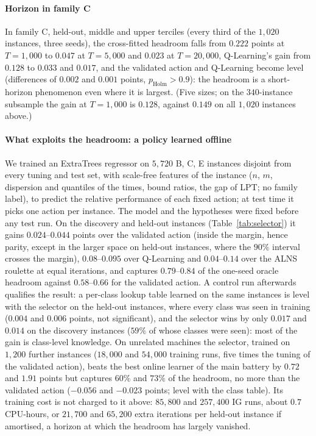 \paragraph{Horizon in family C} In family C, held-out, middle and upper terciles (every third of the $1{,}020$ instances, three seeds), the cross-fitted headroom falls from $0.222$ points at $T=1{,}000$ to $0.047$ at $T=5{,}000$ and $0.023$ at $T=20{,}000$, Q-Learning's gain from $0.128$ to $0.033$ and $0.017$, and the validated action and Q-Learning become level (differences of $0.002$ and $0.001$ points, $p_{\mathrm{Holm}}>0.9$): the headroom is a short-horizon phenomenon even where it is largest. (Five sizes; on the $340$-instance subsample the gain at $T=1{,}000$ is $0.128$, against $0.149$ on all $1{,}020$ instances above.)

\paragraph{What exploits the headroom: a policy learned offline} We trained an ExtraTrees regressor on $5{,}720$ B, C, E instances disjoint from every tuning and test set, with scale-free features of the instance ($n$, $m$, dispersion and quantiles of the times, bound ratios, the gap of LPT; no family label), to predict the relative performance of each fixed action; at test time it picks one action per instance. The model and the hypotheses were fixed before any test run. On the discovery and held-out instances (Table~\ref{tab:selector}) it gains $0.024$--$0.044$ points over the validated action (inside the margin, hence parity, except in the larger space on held-out instances, where the $90\%$ interval crosses the margin), $0.08$--$0.095$ over Q-Learning and $0.04$--$0.14$ over the ALNS roulette at equal iterations, and captures $0.79$--$0.84$ of the one-seed oracle headroom against $0.58$--$0.66$ for the validated action. A control run afterwards qualifies the result: a per-class lookup table learned on the same instances is level with the selector on the held-out instances, where every class was seen in training ($0.004$ and $0.006$ points, not significant), and the selector wins by only $0.017$ and $0.014$ on the discovery instances ($59\%$ of whose classes were seen): most of the gain is class-level knowledge. On unrelated machines the selector, trained on $1{,}200$ further instances ($18{,}000$ and $54{,}000$ training runs, five times the tuning of the validated action), beats the best online learner of the main battery by $0.72$ and $1.91$ points but captures $60\%$ and $73\%$ of the headroom, no more than the validated action ($-0.056$ and $-0.023$ points; level with the class table). Its training cost is not charged to it above: $85{,}800$ and $257{,}400$ IG runs, about $0.7$ CPU-hours, or $21{,}700$ and $65{,}200$ extra iterations per held-out instance if amortised, a horizon at which the headroom has largely vanished.

